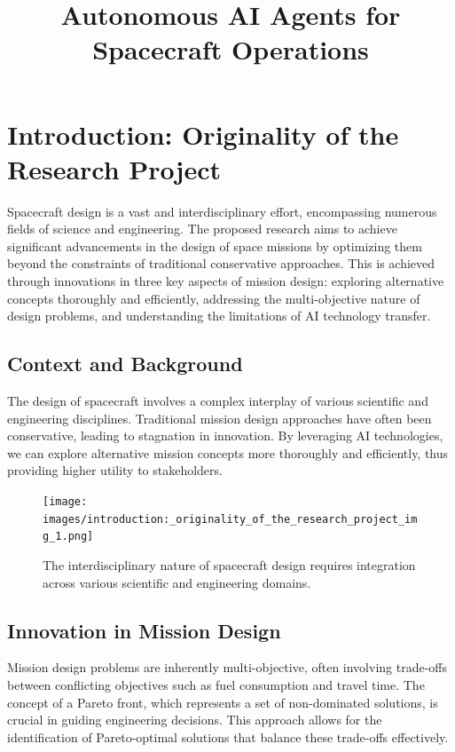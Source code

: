 \documentclass[a4paper,12pt]{article}
\title{Autonomous AI Agents for Spacecraft Operations}
\author{}
\date{}
\begin{document}
\maketitle

\tableofcontents

\newpage

\section{Introduction: Originality of the Research Project}

Spacecraft design is a vast and interdisciplinary effort, encompassing numerous fields of science and engineering. The proposed research aims to achieve significant advancements in the design of space missions by optimizing them beyond the constraints of traditional conservative approaches. This is achieved through innovations in three key aspects of mission design: exploring alternative concepts thoroughly and efficiently, addressing the multi-objective nature of design problems, and understanding the limitations of AI technology transfer.

\subsection{Context and Background}

The design of spacecraft involves a complex interplay of various scientific and engineering disciplines. Traditional mission design approaches have often been conservative, leading to stagnation in innovation. By leveraging AI technologies, we can explore alternative mission concepts more thoroughly and efficiently, thus providing higher utility to stakeholders.

\begin{figure}[htbp]
    \centering
    \texttt{[image: images/introduction:\_originality\_of\_the\_research\_project\_img\_1.png]}
    \caption{The interdisciplinary nature of spacecraft design requires integration across various scientific and engineering domains.}
    \label{fig:introduction:_originality_of_the_research_project_1}
\end{figure}

\subsection{Innovation in Mission Design}

Mission design problems are inherently multi-objective, often involving trade-offs between conflicting objectives such as fuel consumption and travel time. The concept of a Pareto front, which represents a set of non-dominated solutions, is crucial in guiding engineering decisions. This approach allows for the identification of Pareto-optimal solutions that balance these trade-offs effectively.
\end{document}
